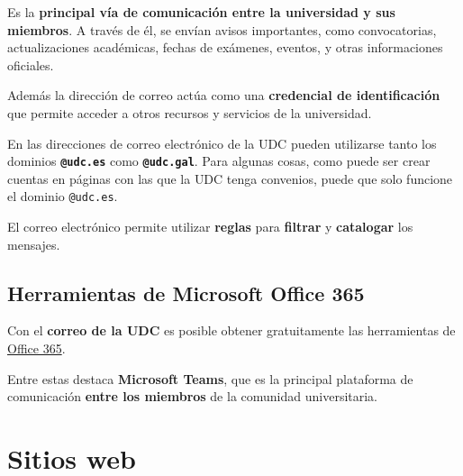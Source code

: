 Es la \textbf{principal vía de comunicación entre la universidad y sus miembros}. A través de él, se envían avisos importantes, como convocatorias, actualizaciones académicas, fechas de exámenes, eventos, y otras informaciones oficiales.

Además la dirección de correo actúa como una \textbf{credencial de identificación} que permite acceder a otros recursos y servicios de la universidad.

\begin{curiosityBox}
    En las direcciones de correo electrónico de la \acrshort{UDC} pueden utilizarse tanto los dominios \textbf{\texttt{@udc.es}} como \textbf{\texttt{@udc.gal}}. Para algunas cosas, como puede ser crear cuentas en páginas con las que la \acrshort{UDC} tenga convenios, puede que solo funcione el dominio \texttt{@udc.es}.
\end{curiosityBox}

\begin{rememberBox}
    El correo electrónico permite utilizar \textbf{reglas} para \textbf{filtrar} y \textbf{catalogar} los mensajes. 
\end{rememberBox}

\subsection{Herramientas de Microsoft Office 365}

Con el \textbf{correo de la \acrshort{UDC}} es posible obtener gratuitamente las herramientas de \href{https://www.office.com/}{Office 365}.

\FloatBarrier
\begin{figure}[htp]
    \centering
\end{figure}
\FloatBarrier

Entre estas destaca \textbf{Microsoft Teams}, que es la principal plataforma de comunicación \textbf{entre los miembros} de la comunidad universitaria.


\section{Sitios web}


